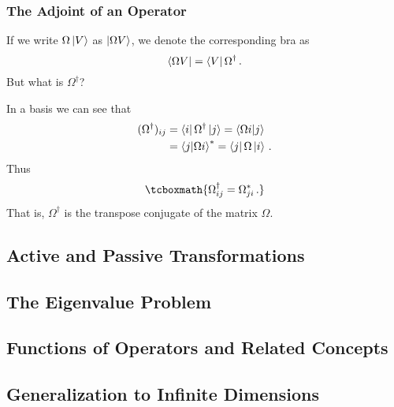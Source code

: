 
\subsubsection{The Adjoint of an Operator}

If we write $\Omega \ket{V}$ as $\ket{\Omega V}$, we denote the corresponding bra as
\begin{equation}
    \bra{\Omega V} = \bra{V} \Omega^\dagger\,.
\end{equation}
But what is $\Omega^\dagger$?

In a basis we can see that
\begin{align}
    (\Omega^\dagger)_{ij} &= \bra{i}\Omega^\dagger\ket{j} = \braket{\Omega i}{j} \\
    &= \braket{j}{\Omega i}^* = \bra{j}\Omega\ket{i}\,.
\end{align}
Thus
\begin{equation}\label{operator adjoint elements}
    \tcboxmath{\Omega^\dagger_{ij} = \Omega^*_{ji}\,.}
\end{equation}
That is, $\Omega^\dagger$ is the transpose conjugate of the matrix $\Omega$.


\subsection{Active and Passive Transformations}


\subsection{The Eigenvalue Problem}


\subsection{Functions of Operators and Related Concepts}


\subsection{Generalization to Infinite Dimensions}
